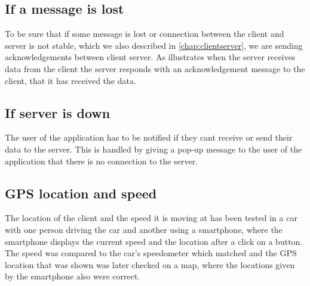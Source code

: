 \subsection{If a message is lost}
To be sure that if some message is lost or connection between the client and server is not stable, which we also described in \autoref{chap:clientserver}, we are sending acknowledgements between client server. As   illustrates when the server receives data from the client the server responds with an acknowledgement message to the client, that it has received the data.

\subsection{If server is down}
The user of the application has to be notified if they cant receive or send their data to the server. This is handled by giving a pop-up message to the user of the application that there is no connection to the server.

\subsection{GPS location and speed}
The location of the client and the speed it is moving at has been tested in a car with one person driving the car and another using a smartphone, where the smartphone displays the current speed and the location after a click on a button. The speed was compared to the car's speedometer which matched and the GPS location that was shown was later checked on a map, where the locations given by the smartphone also were correct.

